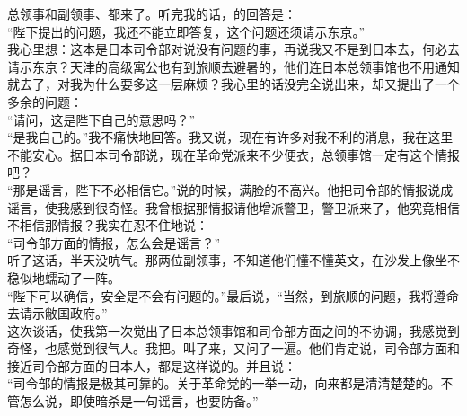 总领事和副领事、都来了。听完我的话，的回答是：\\

“陛下提出的问题，我还不能立即答复，这个问题还须请示东京。”\\

我心里想：这本是日本司令部对说没有问题的事，再说我又不是到日本去，何必去请示东京？天津的高级寓公也有到旅顺去避暑的，他们连日本总领事馆也不用通知就去了，对我为什么要多这一层麻烦？我心里的话没完全说出来，却又提出了一个多余的问题：\\

“请问，这是陛下自己的意思吗？”\\

“是我自己的。”我不痛快地回答。我又说，现在有许多对我不利的消息，我在这里不能安心。据日本司令部说，现在革命党派来不少便衣，总领事馆一定有这个情报吧？\\

“那是谣言，陛下不必相信它。”说的时候，满脸的不高兴。他把司令部的情报说成谣言，使我感到很奇怪。我曾根据那情报请他增派警卫，警卫派来了，他究竟相信不相信那情报？我实在忍不住地说：\\

“司令部方面的情报，怎么会是谣言？”\\

听了这话，半天没吭气。那两位副领事，不知道他们懂不懂英文，在沙发上像坐不稳似地蠕动了一阵。\\

“陛下可以确信，安全是不会有问题的。”最后说，“当然，到旅顺的问题，我将遵命去请示敝国政府。”\\

这次谈话，使我第一次觉出了日本总领事馆和司令部方面之间的不协调，我感觉到奇怪，也感觉到很气人。我把。叫了来，又问了一遍。他们肯定说，司令部方面和接近司令部方面的日本人，都是这样说的。并且说：\\

“司令部的情报是极其可靠的。关于革命党的一举一动，向来都是清清楚楚的。不管怎么说，即使暗杀是一句谣言，也要防备。”\\


